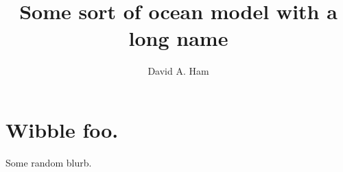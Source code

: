 \documentclass[landscape]{imposter}
\title{Some sort of ocean model with a long name}
\author{David A. Ham}
\begin{document}
\section{Wibble foo.}

Some random blurb. 
\IMposterargs
\end{document}
